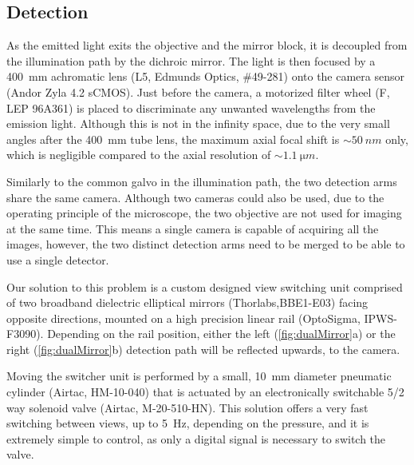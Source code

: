   \subsection{Detection}
    As the emitted light exits the objective and the mirror block, it is decoupled from the illumination path by the dichroic mirror. The light is then focused by a \SI{400}{mm} achromatic lens (L5, Edmunds Optics, \#49-281) onto the camera sensor (Andor Zyla 4.2 sCMOS). Just before the camera, a motorized filter wheel (F, LEP 96A361) is placed to discriminate any unwanted wavelengths from the emission light. Although this is not in the infinity space, due to the very small angles after the \SI{400}{mm} tube lens, the maximum axial focal shift is $\sim \SI{50}{nm}$ only, which is negligible compared to the axial resolution of $\sim \SI{1.1}{\micro m}$.

    Similarly to the common galvo in the illumination path, the two detection arms share the same camera. Although two cameras could also be used, due to the operating principle of the microscope, the two objective are not used for imaging at the same time. This means a single camera is capable of acquiring all the images, however, the two distinct detection arms need to be merged to be able to use a single detector.
    
    Our solution to this problem is a custom designed view switching unit comprised of two broadband dielectric elliptical mirrors (Thorlabs,BBE1-E03) facing opposite directions, mounted on a high precision linear rail (OptoSigma, IPWS-F3090). Depending on the rail position, either the left (\autoref{fig:dualMirror}a) or the right (\autoref{fig:dualMirror}b) detection path will be reflected upwards, to the camera. 

    Moving the switcher unit is performed by a small, \SI{10}{mm} diameter pneumatic cylinder (Airtac, HM-10-040) that is actuated by an electronically switchable 5/2 way solenoid valve (Airtac, M-20-510-HN). This solution offers a very fast switching between views, up to \SI{5}{Hz}, depending on the pressure, and it is extremely simple to control, as only a digital signal is necessary to switch the valve. 

